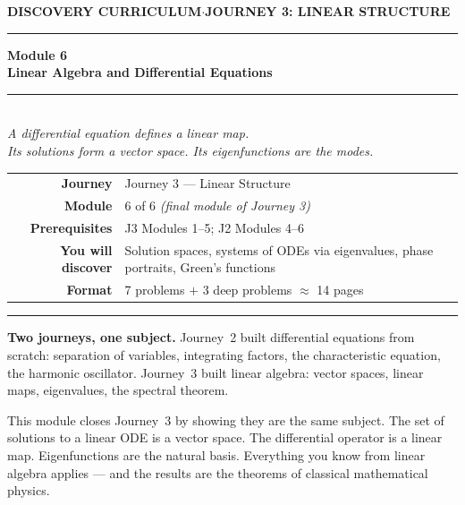 \documentclass[12pt,a4paper]{article}
\newcounter{problem}
\begin{document}
\thispagestyle{empty}
\begin{center}
{\small\color{MidBlue}\textbf{DISCOVERY CURRICULUM}\quad$\cdot$\quad\textbf{JOURNEY 3: LINEAR STRUCTURE}}
\vspace{0.6cm}

{\color{NavyBlue}\rule{\linewidth}{2pt}}\vspace{0.5cm}

{\Huge\bfseries\color{NavyBlue}Module 6}\\[0.3cm]
{\LARGE\bfseries\color{MidBlue}Linear Algebra and Differential Equations}\\[0.4cm]
{\color{Gold}\rule{0.4\linewidth}{1.2pt}}\\[0.4cm]
{\large\itshape\color{DarkGrey}
A differential equation defines a linear map.\\[0.15cm]
Its solutions form a vector space. Its eigenfunctions are the modes.}

\vspace{1cm}
\begin{tabular}{rl}
\color{DarkGrey}\textbf{Journey}         & Journey 3 --- Linear Structure \\[4pt]
\color{DarkGrey}\textbf{Module}          & 6 of 6 \textit{(final module of Journey 3)} \\[4pt]
\color{DarkGrey}\textbf{Prerequisites}   & J3 Modules 1--5; J2 Modules 4--6 \\[4pt]
\color{DarkGrey}\textbf{You will discover} & Solution spaces, systems of ODEs via eigenvalues, phase portraits, Green's functions \\[4pt]
\color{DarkGrey}\textbf{Format}          & 7 problems $+$ 3 deep problems $\approx$ 14 pages \\
\end{tabular}
\vspace{1cm}

{\color{NavyBlue}\rule{\linewidth}{2pt}}
\end{center}

\vspace{0.5cm}
\noindent\textbf{Two journeys, one subject.}
Journey~2 built differential equations from scratch: separation of variables, integrating factors, the characteristic equation, the harmonic oscillator. Journey~3 built linear algebra: vector spaces, linear maps, eigenvalues, the spectral theorem.

\medskip
This module closes Journey~3 by showing they are the same subject. The set of solutions to a linear ODE is a vector space. The differential operator is a linear map. Eigenfunctions are the natural basis. Everything you know from linear algebra applies --- and the results are the theorems of classical mathematical physics.
\end{document}
